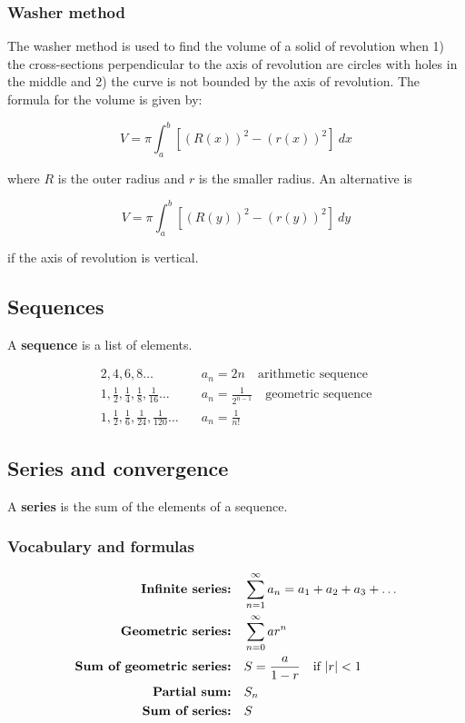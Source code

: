 \documentclass[letterpaper, 12pt]{article}
\begin{document}
\subsubsection*{Washer method}

The washer method is used to find the volume of a solid of revolution when 1) the cross-sections perpendicular to the axis of revolution are circles with holes in the middle and 2) the curve is not bounded by the axis of revolution. The formula for the volume is given by:

$$V = \pi \int_{a}^{b} \left[ (R(x))^2 - (r(x))^2 \right] \: dx$$

where $R$ is the outer radius and $r$ is the smaller radius. An alternative is 

$$V = \pi \int_{a}^{b} \left[ (R(y))^2 - (r(y))^2 \right] \: dy$$

if the axis of revolution is vertical.

\subsection*{Sequences}

A \textbf{sequence} is a list of elements.

\begin{align*}
2,4,6,8\dots \quad & a_n = 2n \quad \text{arithmetic sequence} \\
1, \frac12, \frac14, \frac18, \frac{1}{16}\dots \quad & a_n = \frac{1}{2^{n-1}} \quad \text{geometric sequence}\\
1, \frac12, \frac16, \frac{1}{24}, \frac{1}{120}\dots \quad & a_n = \frac{1}{n!}
\end{align*}

\subsection*{Series and convergence}

A \textbf{series} is the sum of the elements of a sequence.

\subsubsection*{Vocabulary and formulas}

\begin{align*}
\text{\textbf{Infinite series:}} & \quad \sum_{n=1}^\infty a_n = a_1 + a_2 + a_3 + \dots \\ 
\text{\textbf{Geometric series:}} & \quad \sum_{n=0}^\infty ar^n \\
\text{\textbf{Sum of geometric series:}} & \quad S = \frac{a}{1-r} \quad \text{if } |r| < 1 \\
\text{\textbf{Partial sum:}} & \quad S_n \\
\text{\textbf{Sum of series:}} & \quad S \\
\end{align*}
\end{document}
